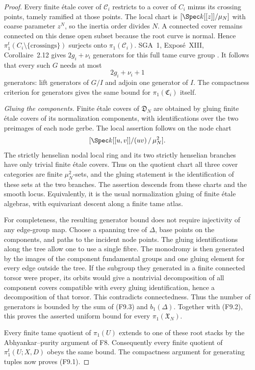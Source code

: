 \begin{proof}
Every finite \'etale cover of $\mathcal C_i$ restricts to a cover
of $C_i$ minus its crossing points, tamely ramified at those
points. The local chart is $[\Spec k[[z]]/\mu_N]$ with coarse
parameter $z^N$, so the inertia order divides $N$. A connected
cover remains connected on this dense open subset because the
root curve is normal. Hence
$\pi_1^t(C_i\setminus\{\text{crossings}\})$ surjects onto
$\pi_1(\mathcal C_i)$.
SGA~1, Expos\'e~XIII, Corollaire~2.12 gives $2g_i+\nu_i$
generators for this full tame curve group
\cite[original p.~392; retyped pp.~290--292]{SGA1TameCurves}.
It follows that every such $G$ needs at most
\[
                              2g_i+\nu_i+1               \tag{F9.3}
\]
generators: lift generators of $G/I$ and adjoin one generator of
$I$. The compactness criterion for generators gives the same bound
for $\pi_1(\mathfrak C_i)$ itself.

\emph{Gluing the components.}
Finite \'etale covers of $\mathfrak D_N$ are obtained by gluing
finite \'etale covers of its normalization components, with
identifications over the two preimages of each node gerbe.
The local assertion follows on the node chart
\[
 [\Spec k[[u,v]]/(uv)\,/\,\mu_N^2].
\]
The strictly henselian nodal local ring and its two strictly
henselian branches have only trivial finite \'etale covers. Thus
on the quotient chart all three cover categories are finite
$\mu_N^2$-sets, and the gluing statement is the identification
of these sets at the two branches. The assertion descends from
these charts and the smooth locus. Equivalently, it is the usual
normalization gluing of finite \'etale algebras, with equivariant
descent along a finite tame atlas.

For completeness, the resulting generator bound does not require
injectivity of any edge-group map. Choose a spanning tree of
$\Delta$, base points on the components, and paths to the incident
node points. The gluing identifications along the tree allow one
to use a single fibre. The monodromy is then generated by the
images of the component fundamental groups and one gluing
element for every edge outside the tree. If the subgroup they
generated in a finite connected torsor were proper, its orbits
would give a nontrivial decomposition of all component covers
compatible with every gluing identification, hence a decomposition
of that torsor. This contradicts connectedness. Thus the number
of generators is bounded by the sum of (F9.3) and $b_1(\Delta)$.
Together with (F9.2), this proves the asserted uniform bound for
every $\pi_1(\mathfrak X_N)$.

Every finite tame quotient of $\pi_1(U)$ extends to one of these
root stacks by the Abhyankar--purity argument of F8. Consequently
every finite quotient of $\pi_1^t(U;X,D)$ obeys the same bound.
The compactness argument for generating tuples now proves (F9.1).
\end{proof}

